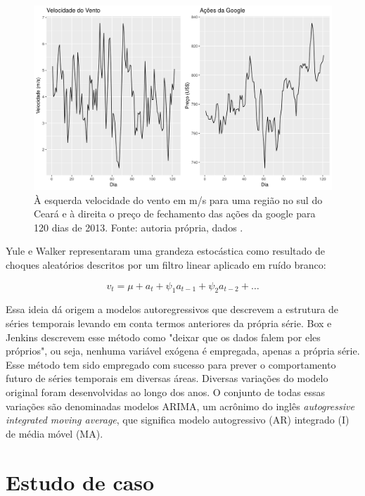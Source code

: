 \documentclass[
	12pt,				%
	openright,			%
	oneside,			%
	a4paper,			%
	english,			%
	french,				%
	spanish,			%
	brazil				%
	]{abntex2}
\begin{document}
\begin{figure}[h]
    \centering
	\includegraphics[width=\textwidth]{wind_money}
	\caption{À esquerda velocidade do vento em m/s para uma região no sul do Ceará e à direita o preço de fechamento das ações da google para 120 dias de 2013. Fonte: autoria própria, dados \cite{era5}.}
\end{figure}
\FloatBarrier

Yule e Walker representaram uma grandeza estocástica como resultado de choques aleatórios descritos por um filtro linear aplicado em ruído branco:

$$ v_{t} = \mu + a_t + \psi_{1}a_{t-1} + \psi_{2}a_{t-2} + \dots $$

Essa ideia dá origem a modelos autoregressivos que descrevem a estrutura de séries temporais levando em conta termos anteriores da própria série. Box e Jenkins descrevem esse método como "deixar que os dados falem por eles próprios", ou seja, nenhuma variável exógena é empregada, apenas a própria série. Esse método tem sido empregado com sucesso para prever o comportamento futuro de séries temporais em diversas áreas. Diversas variações do modelo original foram desenvolvidas ao longo dos anos. O conjunto de todas essas variações são denominadas modelos ARIMA, um acrônimo do inglês \textit{autogressive integrated moving average}, que significa modelo autogressivo (AR) integrado (I) de média móvel (MA).


\cleardoublepage
\part{Estudo de caso}
\end{document}
